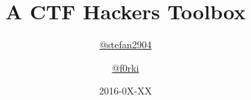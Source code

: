 \documentclass[english,xcolor={x11names,svgnames,dvipsnames}]{beamer}
\author{\href{https://twitter.com/stefan2904}{@stefan2904} \and \href{https://twitter.com/f0rki}{@f0rki}}
\title{A CTF Hackers Toolbox}
\subtitle{}
\date{2016-0X-XX}
\begin{document}
\begin{frame}[t,plain]
    \titlepage
\end{frame}


\end{document}
